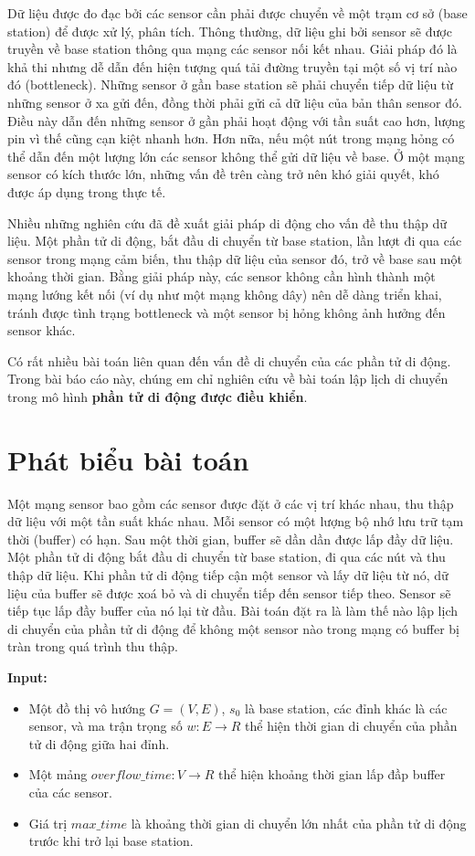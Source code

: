 \documentclass[12pt]{report}
\begin{document}
	Dữ liệu được đo đạc bởi các sensor cần phải được chuyển về một trạm  cơ sở (base station) để được xử lý, phân tích. Thông thường, dữ liệu ghi bởi sensor sẽ được truyền về base station thông qua mạng các sensor nối kết nhau. Giải pháp đó là khả thi nhưng dễ dẫn đến hiện tượng quá tải đường truyền tại một số vị trí nào đó (bottleneck). Những sensor ở gần base station sẽ phải chuyển tiếp dữ liệu từ những sensor ở xa gửi đến, đồng thời phải gửi cả dữ liệu của bản thân sensor đó. Điều này dẫn đến những sensor ở gần phải hoạt động với tần suất cao hơn, lượng pin vì thế cũng cạn kiệt nhanh hơn. Hơn nữa, nếu một nút trong mạng hỏng có thể dẫn đến một lượng lớn các sensor không thể gửi dữ liệu về base. Ở một mạng sensor có kích thước lớn, những vấn đề trên càng trở nên khó giải quyết, khó được áp dụng trong thực tế. 
	
	Nhiều những nghiên cứu đã đề xuất giải pháp di động cho vấn đề thu thập dữ liệu. Một phần tử di động, bắt đầu di chuyển từ base station, lần lượt đi qua các sensor trong mạng cảm biến, thu thập dữ liệu của sensor đó, trở về base sau một khoảng thời gian. Bằng giải pháp này, các sensor không cần hình thành một mạng lướng kết nối (ví dụ như một mạng không dây) nên dễ dàng triển khai, tránh được tình trạng bottleneck và một sensor bị hỏng không ảnh hưởng đến sensor khác. 
	
	Có rất nhiều bài toán liên quan đến vấn đề di chuyển của các phần tử di động. Trong bài báo cáo này, chúng em chỉ nghiên cứu về bài toán lập lịch di chuyển trong mô hình \textbf{phần tử di động được điều khiển}. 
	
\section{Phát biểu bài toán}
Một mạng sensor bao gồm các sensor được đặt ở các vị trí khác nhau, thu thập dữ liệu với một tần suất khác nhau. Mỗi sensor có một lượng bộ nhớ lưu trữ tạm thời (buffer) có hạn. Sau một thời gian, buffer sẽ dần dần được lấp đầy dữ liệu. Một phần tử di động bắt đầu di chuyển từ base station, đi qua các nút và thu thập dữ liệu. Khi phần tử di động tiếp cận một sensor và lấy dữ liệu từ nó, dữ liệu của buffer sẽ được xoá bỏ và di chuyển tiếp đến sensor tiếp theo. Sensor sẽ tiếp tục lấp đầy buffer của nó lại từ đầu. Bài toán đặt ra là làm thế nào lập lịch di chuyển của phần tử di động để không một sensor nào trong mạng có buffer bị tràn trong quá trình thu thập. 
\vspace{5mm}

\textbf{Input:} 
\begin{itemize}
\item Một đồ thị vô hướng $G=(V, E)$, $s_0$ là base station, các đỉnh khác là các sensor, và ma trận trọng số $w: E \rightarrow R$ thể hiện thời gian di chuyển của phần tử di động giữa hai đỉnh.
\item Một mảng $overflow\_time: V \rightarrow R$ thể hiện khoảng thời gian lấp đầp buffer của các sensor.  
\item Giá trị $max\_time$ là khoảng thời gian di chuyển lớn nhất của phần tử di động trước khi trở lại base station. 
\end{itemize}
\end{document}
